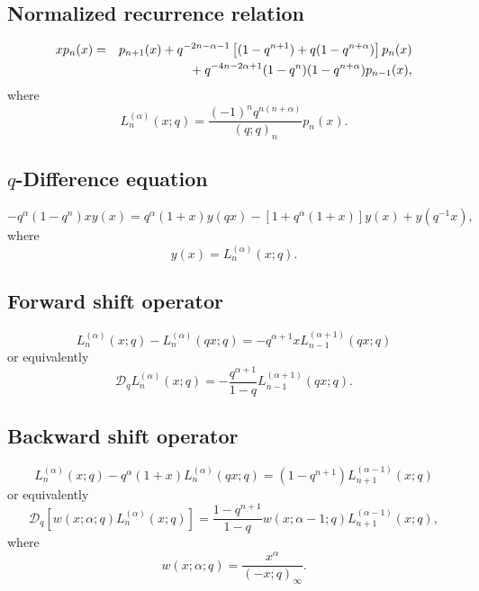 \documentclass[envcountchap,graybox]{svmono}
\newcommand{\mathindent}{\hspace{7.5mm}}
\begin{document}
\subsection*{Normalized recurrence relation}
\begin{eqnarray}
\label{NormRecqLaguerre}
xp_n(x)&=&p_{n+1}(x)+q^{-2n-\alpha-1}\left[(1-q^{n+1})+q(1-q^{n+\alpha})\right]p_n(x)\nonumber\\
& &{}\mathindent{}+q^{-4n-2\alpha+1}(1-q^n)(1-q^{n+\alpha})p_{n-1}(x),
\end{eqnarray}
where
$$L_n^{(\alpha)}(x;q)=\frac{(-1)^nq^{n(n+\alpha)}}{(q;q)_n}p_n(x).$$

\subsection*{$q$-Difference equation}
\begin{equation}
\label{dvqLaguerre}
-q^{\alpha}(1-q^n)xy(x)=q^{\alpha}(1+x)y(qx)-\left[1+q^{\alpha}(1+x)\right]y(x)+y(q^{-1}x),
\end{equation}
where
$$y(x)=L_n^{(\alpha)}(x;q).$$

\subsection*{Forward shift operator}
\begin{equation}
\label{shift1qLaguerreI}
L_n^{(\alpha)}(x;q)-L_n^{(\alpha)}(qx;q)=-q^{\alpha+1}xL_{n-1}^{(\alpha+1)}(qx;q)
\end{equation}
or equivalently
\begin{equation}
\label{shift1qLaguerreII}
\mathcal{D}_qL_n^{(\alpha)}(x;q)=-\frac{q^{\alpha+1}}{1-q}L_{n-1}^{(\alpha+1)}(qx;q).
\end{equation}

\subsection*{Backward shift operator}
\begin{equation}
\label{shift2qLaguerreI}
L_n^{(\alpha)}(x;q)-q^{\alpha}(1+x)L_n^{(\alpha)}(qx;q)=(1-q^{n+1})L_{n+1}^{(\alpha-1)}(x;q)
\end{equation}
or equivalently
\begin{equation}
\label{shift2qLaguerreII}
\mathcal{D}_q\left[w(x;\alpha;q)L_n^{(\alpha)}(x;q)\right]=
\frac{1-q^{n+1}}{1-q}w(x;\alpha-1;q)L_{n+1}^{(\alpha-1)}(x;q),
\end{equation}
where
$$w(x;\alpha;q)=\frac{x^{\alpha}}{(-x;q)_{\infty}}.$$
\end{document}
